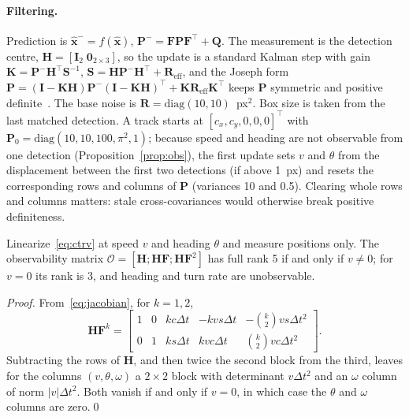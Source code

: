 \documentclass[twocolumn]{svjour3}
\begin{document}
\paragraph{Filtering.}
Prediction is $\hat{\mathbf{x}}^-=f(\hat{\mathbf{x}})$,
$\mathbf{P}^-=\mathbf{F}\mathbf{P}\mathbf{F}^{\top}+\mathbf{Q}$. The measurement is
the detection centre, $\mathbf{H}=[\mathbf{I}_2\;\mathbf{0}_{2\times3}]$, so the
update is a standard Kalman step with gain
$\mathbf{K}=\mathbf{P}^-\mathbf{H}^{\top}\mathbf{S}^{-1}$,
$\mathbf{S}=\mathbf{H}\mathbf{P}^-\mathbf{H}^{\top}+\mathbf{R}_{\mathrm{eff}}$, and
the Joseph form
$\mathbf{P}=(\mathbf{I}-\mathbf{K}\mathbf{H})\mathbf{P}^-(\mathbf{I}-\mathbf{K}\mathbf{H})^{\top}+\mathbf{K}\mathbf{R}_{\mathrm{eff}}\mathbf{K}^{\top}$
keeps $\mathbf{P}$ symmetric and positive definite~\cite{BarShalom2001_estimation}.
The base noise is $\mathbf{R}=\mathrm{diag}(10,10)$~px$^2$. Box size is taken from
the last matched detection. A track starts at $[c_x,c_y,0,0,0]^{\top}$ with
$\mathbf{P}_0=\mathrm{diag}(10,10,100,\pi^2,1)$; because speed and heading are not
observable from one detection (Proposition~\ref{prop:obs}), the first update sets
$v$ and $\theta$ from the displacement between the first two detections (if
above 1~px) and resets the corresponding rows and columns of $\mathbf{P}$
(variances 10 and 0.5). Clearing whole rows and columns matters: stale
cross-covariances would otherwise break positive definiteness.

\begin{proposition}\label{prop:obs}
Linearize~\eqref{eq:ctrv} at speed $v$ and heading $\theta$ and measure positions
only. The observability matrix
$\mathcal{O}=[\mathbf{H};\mathbf{H}\mathbf{F};\mathbf{H}\mathbf{F}^{2}]$ has full
rank 5 if and only if $v\neq0$; for $v=0$ its rank is 3, and heading and turn
rate are unobservable.
\end{proposition}
\begin{proof}
From~\eqref{eq:jacobian}, for $k=1,2$,
\begin{equation*}
\mathbf{H}\mathbf{F}^{k}=\begin{bmatrix}
1&0&kc\Delta t&-kvs\Delta t&-\binom{k}{2}vs\Delta t^{2}\\
0&1&ks\Delta t&kvc\Delta t&\binom{k}{2}vc\Delta t^{2}
\end{bmatrix}.
\end{equation*}
Subtracting the rows of $\mathbf{H}$, and then twice the second block from the
third, leaves for the columns $(v,\theta,\omega)$ a $2\times2$ block with
determinant $v\Delta t^{2}$ and an $\omega$ column of norm $|v|\Delta t^{2}$.
Both vanish if and only if $v=0$, in which case the $\theta$ and $\omega$
columns are zero.\qed
\end{proof}
\end{document}
